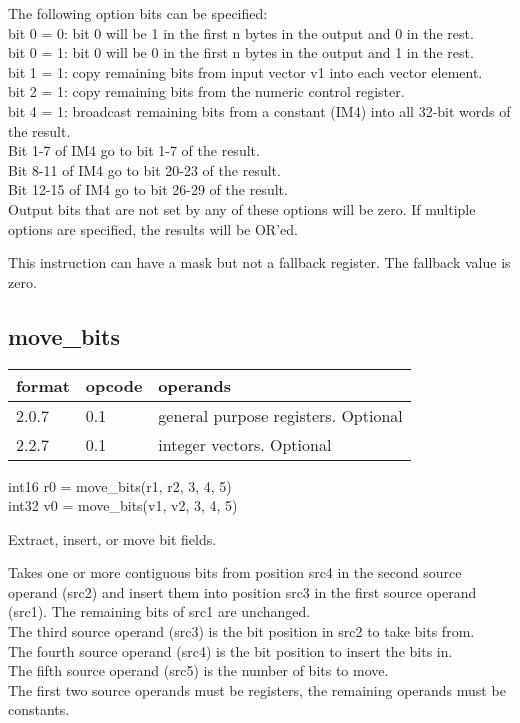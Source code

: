 \documentclass[forwardcom.tex]{subfiles}
\begin{document}
The following option bits can be specified: \\
bit 0 = 0: bit 0 will be 1 in the first n bytes in the output and 0 in the rest. \\
bit 0 = 1: bit 0 will be 0 in the first n bytes in the output and 1 in the rest. \\
bit 1 = 1: copy remaining bits from input vector v1 into each vector element. \\
bit 2 = 1: copy remaining bits from the numeric control register. \\
bit 4 = 1: broadcast remaining bits from a constant (IM4) into all 32-bit words of the result. \\
\hspace{17mm} Bit 1-7 of IM4 go to bit 1-7 of the result. \\
\hspace{17mm} Bit 8-11 of IM4 go to bit 20-23 of the result. \\
\hspace{17mm} Bit 12-15 of IM4 go to bit 26-29 of the result. \\
Output bits that are not set by any of these options will be zero. 
If multiple options are specified, the results will be OR'ed.

\vv
This instruction can have a mask but not a fallback register. The fallback value is zero.
\vv


\subsection{move\_bits}
\label{table:moveBitsInstruction}
\begin{tabular}{|p{12mm}|p{15mm}|p{100mm}|}
\hline
\bfseries format & \bfseries opcode & \bfseries operands \\ \hline
2.0.7 & 0.1 & general purpose registers. Optional \\ \hline
2.2.7 & 0.1 & integer vectors. Optional \\ \hline
\end{tabular}
\vv

int16 r0 = move\_bits(r1, r2, 3, 4, 5) \\
int32 v0 = move\_bits(v1, v2, 3, 4, 5) \\
\vv

Extract, insert, or move bit fields.
\vv

Takes one or more contiguous bits from position src4 in the second source operand (src2) and insert them into position src3 in the first source operand (src1). The remaining bits of src1 are unchanged. \\
The third source operand (src3) is the bit position in src2 to take bits from. \\
The fourth source operand (src4) is the bit position to insert the bits in. \\
The fifth source operand (src5) is the number of bits to move. \\
The first two source operands must be registers, the remaining operands must be constants.
\vv
\end{document}
